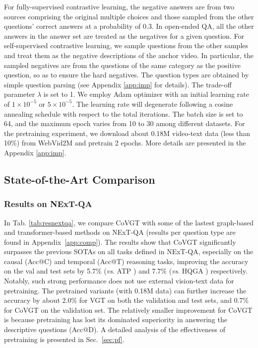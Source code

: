 \documentclass[10pt,journal,compsoc]{IEEEtran}
\newcommand{\vs}{\textit{vs}. }
\begin{document}
For fully-supervised contrastive learning, the negative answers are from two sources comprising the original multiple choices and those sampled from the other questions' correct answers at a probability of 0.3. In open-ended QA, all the other answers in the answer set are treated as the negatives for a given question. For self-supervised contrastive learning, we sample questions from the other samples and treat them as the negative descriptions of the anchor video. In particular, the sampled negatives are from the questions of the same category as the positive question, so as to ensure the hard negatives. The question types are obtained by simple question parsing (see Appendix \ref{app:imp} for details). The trade-off parameter $\lambda$ is set to 1.
We employ Adam \cite{kingma2014adam} optimizer with an initial learning rate of $1\times10^{-5}$ or $5\times10^{-5}$. The learning rate will degenerate following a cosine annealing schedule with respect to the total iterations. The batch size is set to 64, and the maximum epoch varies from 10 to 30 among different datasets. For the pretraining experiment, we download about 0.18M video-text data (less than 10\%) from WebVid2M
\cite{bain2021frozen} and pretrain 2 epochs. More details are presented in the Appendix \ref{app:imp}.

\subsection{State-of-the-Art Comparison}
\label{sec:cpsota}
\subsubsection{Results on NExT-QA}
In Tab. \ref{tab:resnextqa}, we compare CoVGT with some of the lastest graph-based and transformer-based methods on NExT-QA (results per question type are found in Appendix~\ref{app:comp}). The results show that CoVGT significantly surpasses the previous SOTAs on all tasks defined in NExT-QA, especially on the causal (Acc@C) and temporal (Acc@T) reasoning tasks, improving the accuracy on the val and test sets by 5.7\% (\vs ATP \cite{buch2022revisiting}) and 7.7\% (\vs HQGA \cite{xiao2021video}) respectively. Notably, such strong performance does not use external vision-text data for pretraining. The pretrained variants (with 0.18M data) can further increase the accuracy by about 2.0\% for VGT on both the validation and test sets, and 0.7\% for CoVGT on the validation set. The relatively smaller improvement for CoVGT is because pretraining has lost its dominated superiority in answering the descriptive questions (Acc@D). A detailed analysis of the effectiveness of pretraining is presented in Sec.~\ref{sec:pf}.
\end{document}
